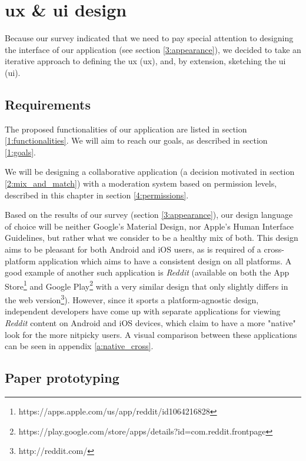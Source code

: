 \chapter{\acrshort{ux} \& \acrshort{ui} design} \label{chapter4}

Because our survey indicated that we need to pay special attention to designing the interface of our application (see section \ref{3:appearance}), we decided to take an iterative approach to defining the \acrlong{ux} (\acrshort{ux}), and, by extension, sketching the \acrlong{ui} (\acrshort{ui}).

\section{Requirements} \label{4:requirements}

The proposed functionalities of our application are listed in section \ref{1:functionalities}. We will aim to reach our goals, as described in section \ref{1:goals}.

We will be designing a collaborative application (a decision motivated in section \ref{2:mix_and_match}) with a moderation system based on permission levels, described in this chapter in section \ref{4:permissions}.

Based on the results of our survey (section \ref{3:appearance}), our design language of choice will be neither Google's Material Design\cite{google2020material}, nor Apple's Human Interface Guidelines\cite{apple2020human}, but rather what we consider to be a healthy mix of both. This design aims to be pleasant for both Android and iOS users, as is required of a cross-platform application which aims to have a consistent design on all platforms. A good example of another such application is \textit{Reddit} (available on both the App Store\footnote{https://apps.apple.com/us/app/reddit/id1064216828} and Google Play\footnote{https://play.google.com/store/apps/details?id=com.reddit.frontpage} with a very similar design that only slightly differs in the web version\footnote{http://reddit.com/}). However, since it sports a platform-agnostic design, independent developers have come up with separate applications for viewing \textit{Reddit} content on Android and iOS devices, which claim to have a more "native" look for the more nitpicky users. A visual comparison between these applications can be seen in appendix \ref{a:native_cross}.

\section{Paper prototyping} \label{4:paper}


